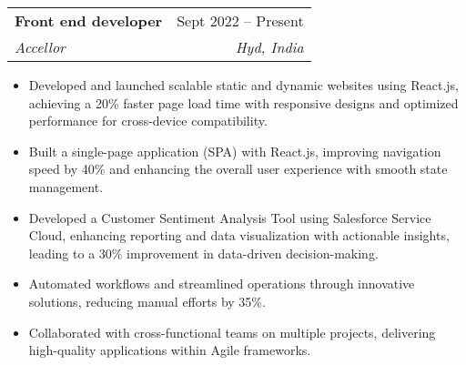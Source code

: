 \documentclass[letterpaper,11pt]{article}
\makeatletter
\newcommand{\resumeItem}[1]{
  \item\small{
    {#1 \vspace{-2pt}}
  }
}
\newcommand{\resumeSubheading}[4]{
  \vspace{-2pt}\item
    \begin{tabular*}{0.97\textwidth}[t]{l@{\extracolsep{\fill}}r}
      \textbf{#1} & #2 \\
      \textit{\small#3} & \textit{\small #4} \\
    \end{tabular*}\vspace{-7pt}
}
\newcommand{\resumeSubSubheading}[2]{
    \item
    \begin{tabular*}{0.97\textwidth}{l@{\extracolsep{\fill}}r}
      \textit{\small#1} & \textit{\small #2} \\
    \end{tabular*}\vspace{-7pt}
}
\newcommand{\resumeSubHeadingListEnd}{\end{itemize}}
\newcommand{\resumeItemListStart}{\begin{itemize}}
\newcommand{\resumeItemListEnd}{\end{itemize}\vspace{-5pt}}
\makeatother
\begin{document}
    \resumeSubheading
      {Front end developer}{Sept 2022 -- Present}
      {Accellor}{Hyd, India}
      \resumeItemListStart
        \resumeItem{Developed and launched scalable static and dynamic websites using React.js, achieving a 20\% faster page load time
with responsive designs and optimized performance for cross-device compatibility.}
        \resumeItem{Built a single-page application (SPA) with React.js, improving navigation speed by 40\% and enhancing the overall
user experience with smooth state management.}
        \resumeItem{Developed a Customer Sentiment Analysis Tool using Salesforce Service Cloud, enhancing reporting and data
visualization with actionable insights, leading to a 30\% improvement in data-driven
decision-making.}
        \resumeItem{Automated workflows and streamlined operations through innovative solutions, reducing manual efforts by 35\%.}
        \resumeItem{Collaborated with cross-functional teams on multiple projects, delivering high-quality applications within Agile frameworks.}
      \resumeItemListEnd


\end{document}
